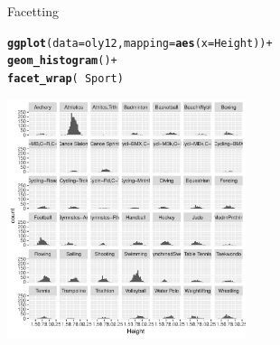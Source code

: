 \documentclass[10pt]{beamer}\usepackage[]{graphicx}\usepackage[]{color}
\makeatletter
\newcommand{\hlopt}[1]{\textcolor[rgb]{0,0,0}{#1}}%
\newcommand{\hlstd}[1]{\textcolor[rgb]{0.345,0.345,0.345}{#1}}%
\newcommand{\hlkwc}[1]{\textcolor[rgb]{0.333,0.667,0.333}{#1}}%
\newcommand{\hlkwd}[1]{\textcolor[rgb]{0.737,0.353,0.396}{\textbf{#1}}}%
\newenvironment{kframe}{%
 \def\at@end@of@kframe{}%
 \ifinner\ifhmode%
  \def\at@end@of@kframe{\end{minipage}}%
  \begin{minipage}{\columnwidth}%
 \fi\fi%
 \def\FrameCommand##1{\hskip\@totalleftmargin \hskip-\fboxsep
 \colorbox{shadecolor}{##1}\hskip-\fboxsep
     \hskip-\linewidth \hskip-\@totalleftmargin \hskip\columnwidth}%
 \MakeFramed {\advance\hsize-\width
   \@totalleftmargin\z@ \linewidth\hsize
   \@setminipage}}%
 {\par\unskip\endMakeFramed%
 \at@end@of@kframe}
\newenvironment{knitrout}{}{} %
\makeatother
\begin{document}
\begin{frame}[fragile]{Facetting}

\begin{knitrout}\scriptsize
{}\color{fgcolor}\begin{kframe}
\begin{alltt}
\hlkwd{ggplot}\hlstd{(}\hlkwc{data} \hlstd{= oly12,} \hlkwc{mapping} \hlstd{=} \hlkwd{aes}\hlstd{(}\hlkwc{x} \hlstd{= Height))} \hlopt{+}
  \hlkwd{geom_histogram}\hlstd{()} \hlopt{+}
  \hlkwd{facet_wrap}\hlstd{(}\hlopt{~} \hlstd{Sport)}
\end{alltt}
\end{kframe}
\includegraphics[width=2.75in,height=2.75in]{figure/unnamed-chunk-11-1} 

\end{knitrout}

\end{frame}
\end{document}
